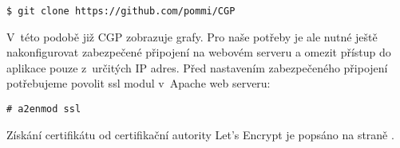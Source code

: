 \begin{verbatim}
$ git clone https://github.com/pommi/CGP
\end{verbatim}

V~této podobě již CGP zobrazuje grafy. Pro naše potřeby je ale nutné ještě nakonfigurovat zabezpečené připojení na webovém serveru a omezit přístup do aplikace pouze z~určitých IP adres. Před nastavením zabezpečeného připojení potřebujeme povolit ssl modul v~Apache web serveru:
\begin{verbatim}
# a2enmod ssl
\end{verbatim}

Získání certifikátu od certifikační autority Let's Encrypt je popsáno na straně \pageref{lets-encrypt}.











